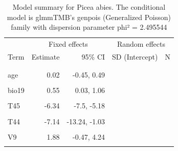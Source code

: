 \documentclass[
]{article}
\begin{document}
\begin{longtable}[t]{lrrrr}
\caption{\label{tab:summaries-tables}\label{tab:Pa}Model summary for Picea abies. The conditional model is glmmTMB's genpois (Generalized Poisson) family with dispersion parameter phi² = 2.495544}\\
\toprule
\multicolumn{1}{c}{ } & \multicolumn{2}{c}{Fixed effects} & \multicolumn{2}{c}{Random effects} \\
\cmidrule(l{3pt}r{3pt}){2-3} \cmidrule(l{3pt}r{3pt}){4-5}
Term & Estimate & 95\% CI & SD (Intercept) & N\\
\midrule
\addlinespace[0.3em]
\multicolumn{5}{l}{\textbf{Conditional model}}\\
\hspace{1em}\cellcolor{gray!6}{Intercept} & \cellcolor{gray!6}{-2.03} & \cellcolor{gray!6}{-2.49, -1.57} & \cellcolor{gray!6}{} & \cellcolor{gray!6}{}\\
\hspace{1em}age & 0.02 & -0.45, 0.49 &  & \\
\hspace{1em}\cellcolor{gray!6}{bio01} & \cellcolor{gray!6}{-0.13} & \cellcolor{gray!6}{-0.71, 0.44} & \cellcolor{gray!6}{} & \cellcolor{gray!6}{}\\
\hspace{1em}bio19 & 0.55 & 0.03, 1.06 &  & \\
\hspace{1em}\cellcolor{gray!6}{relelev} & \cellcolor{gray!6}{0.39} & \cellcolor{gray!6}{0.28, 0.5} & \cellcolor{gray!6}{} & \cellcolor{gray!6}{}\\
\hspace{1em}T45 & -6.34 & -7.5, -5.18 &  & \\
\hspace{1em}\cellcolor{gray!6}{artificial} & \cellcolor{gray!6}{-0.86} & \cellcolor{gray!6}{-1.26, -0.46} & \cellcolor{gray!6}{} & \cellcolor{gray!6}{}\\
\hspace{1em}T44 & -7.14 & -13.24, -1.03 &  & \\
\hspace{1em}\cellcolor{gray!6}{T32} & \cellcolor{gray!6}{-0.95} & \cellcolor{gray!6}{-1.23, -0.66} & \cellcolor{gray!6}{} & \cellcolor{gray!6}{}\\
\hspace{1em}V9 & 1.88 & -0.47, 4.24 &  & \\
\hspace{1em}\cellcolor{gray!6}{V12} & \cellcolor{gray!6}{0.88} & \cellcolor{gray!6}{0.33, 1.43} & \cellcolor{gray!6}{} & \cellcolor{gray!6}{}\\

\end{longtable}
\end{document}
